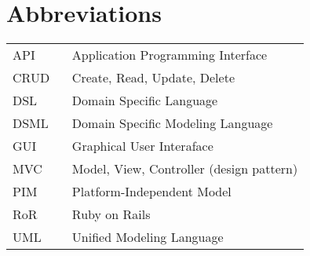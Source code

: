 \chapter*{Abbreviations}

\begin{flushleft}
\begin{tabular}{l p{0.8\linewidth}}
API       & Application Programming Interface\\
CRUD      & Create, Read, Update, Delete\\
DSL       & Domain Specific Language\\
DSML      & Domain Specific Modeling Language\\
GUI       & Graphical User Interaface\\
MVC       & Model, View, Controller (design pattern)\\
PIM       & Platform-Independent Model\\
RoR       & Ruby on Rails\\
UML       & Unified Modeling Language\\
\end{tabular}
\end{flushleft}

